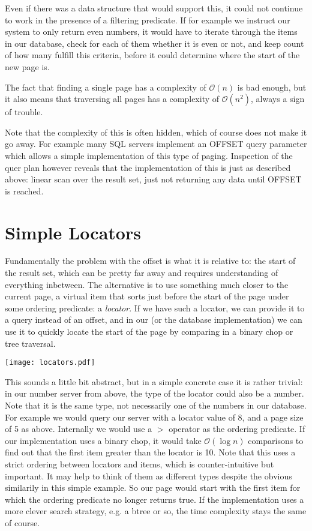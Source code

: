 \documentclass[11pt,a4paper]{article}
\begin{document}
\begin{multicols*}{2}
Even if there was a data structure that would support this, it could not
continue to work in the presence of a filtering predicate. If for example we
instruct our system to only return even numbers, it would have to iterate
through the items in our database, check for each of them whether it is even or
not, and keep count of how many fulfill this criteria, before it could determine
where the start of the new page is.

The fact that finding a single page has a complexity of $\mathcal{O}(n)$ is bad
enough, but it also means that traversing all pages has a complexity of
$\mathcal{O}(n^2)$, always a sign of trouble.

Note that the complexity of this is often hidden, which of course does not make
it go away. For example many SQL servers implement an OFFSET query parameter
which allows a simple implementation of this type of paging. Inspection of the 
quer plan however reveals that the implementation of this is just as described above:
linear scan over the result set, just not returning any data until OFFSET is
reached.

\section*{Simple Locators}

Fundamentally the problem with the offset is what it is relative to: the start
of the result set, which can be pretty far away and requires understanding of
everything inbetween. The alternative is to use something much closer to the
current page, a virtual item that sorts just before the start of the page under
some ordering predicate: a {\em locator}. If we have such a locator, we can provide it
to a query instead of an offset, and in our (or the database implementation) we
can use it to quickly locate the start of the page by comparing in a binary chop
or tree traversal.

\texttt{[image: locators.pdf]}

This sounds a little bit abstract, but in a simple concrete case it is rather
trivial: in our number server from above, the type of the locator could also be
a number. Note that it is the same type, not necessarily one of the numbers in
our database. For example we would query our server with a locator value of 8,
and a page size of 5 as above. Internally we would use a $>$ operator as the
ordering predicate. If our implementation uses a binary chop, it would take
$\mathcal{O}(\log{}n)$ comparisons to find out that the first item greater than
the locator is 10. Note that this uses a
strict ordering between locators and items, which is counter-intuitive but
important. It may help to think of them as different types despite the obvious
similarily in this simple example. So our page would start with the first item
for which the ordering predicate no longer returns true. If the implementation
uses a more clever search strategy, e.g. a btree or so, the time complexity
stays the same of course.


\end{multicols*}
\end{document}
